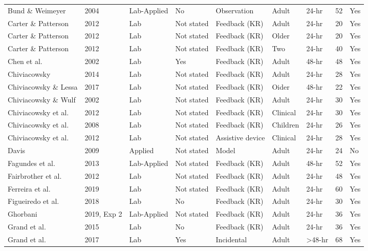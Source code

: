 \documentclass[
  english,
  man, donotrepeattitle,floatsintext]{apa7}
\begin{document}
\begin{landscape}
\begin{ThreePartTable}
\begin{longtable}[l]{lllllllrl}
\addlinespace
Bund \& Weimeyer & 2004 & Lab-Applied & No & Observation & Adult & 24-hr & 52 & Yes\\
\addlinespace
Carter \& Patterson & 2012 & Lab & Not stated & Feedback (KR) & Adult & 24-hr & 20 & Yes\\
\addlinespace
Carter \& Patterson & 2012 & Lab & Not stated & Feedback (KR) & Older & 24-hr & 20 & Yes\\
\addlinespace
Carter \& Patterson & 2012 & Lab & Not stated & Feedback (KR) & Two & 24-hr & 40 & Yes\\
\addlinespace
Chen et al. & 2002 & Lab & Yes & Feedback (KR) & Adult & 48-hr & 48 & Yes\\
\addlinespace
Chiviacowsky & 2014 & Lab & Not stated & Feedback (KR) & Adult & 24-hr & 28 & Yes\\
\addlinespace
Chiviacowsky \& Lessa & 2017 & Lab & Not stated & Feedback (KR) & Oider & 48-hr & 22 & Yes\\
\addlinespace
Chiviacowsky \& Wulf & 2002 & Lab & Not stated & Feedback (KR) & Adult & 24-hr & 30 & Yes\\
\addlinespace
Chiviacowsky et al. & 2012 & Lab & Not stated & Feedback (KR) & Clinical & 24-hr & 30 & Yes\\
\addlinespace
Chiviacowsky et al. & 2008 & Lab & Not stated & Feedback (KR) & Children & 24-hr & 26 & Yes\\
\addlinespace
Chiviacowsky et al. & 2012 & Lab & Not stated & Assistive device & Clinical & 24-hr & 28 & Yes\\
\addlinespace
Davis & 2009 & Applied & Not stated & Model & Adult & 24-hr & 24 & No\\
\addlinespace
Fagundes et al. & 2013 & Lab-Applied & Not stated & Feedback (KR) & Adult & 48-hr & 52 & Yes\\
\addlinespace
Fairbrother et al. & 2012 & Lab & Not stated & Feedback (KR) & Adult & 24-hr & 48 & Yes\\
\addlinespace
Ferreira et al. & 2019 & Lab & Not stated & Feedback (KR) & Adult & 24-hr & 60 & Yes\\
\addlinespace
Figueiredo et al. & 2018 & Lab & No & Feedback (KR) & Adult & 24-hr & 30 & Yes\\
\addlinespace
Ghorbani & 2019, Exp 2 & Lab-Applied & Not stated & Feedback (KR) & Adult & 24-hr & 36 & Yes\\
\addlinespace
Grand et al. & 2015 & Lab & No & Feedback (KR) & Adult & 24-hr & 36 & Yes\\
\addlinespace
Grand et al. & 2017 & Lab & Yes & Incidental & Adult & >48-hr & 68 & Yes\\

\end{longtable}
\end{ThreePartTable}
\end{landscape}
\end{document}
